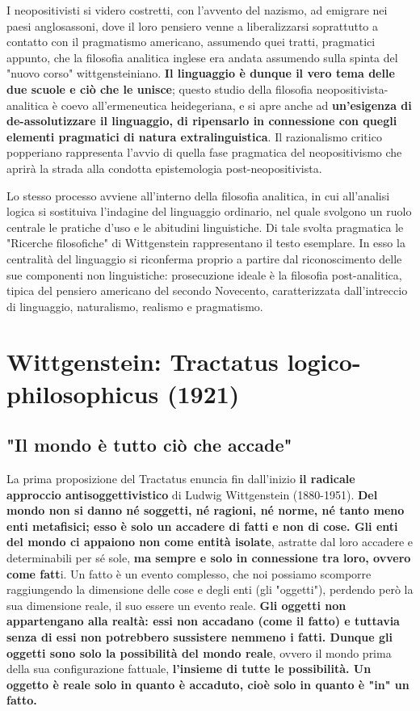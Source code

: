 I neopositivisti
si videro costretti, con l'avvento del nazismo,
ad emigrare nei paesi anglosassoni, dove il loro
pensiero venne a liberalizzarsi soprattutto
a contatto con il pragmatismo americano,
assumendo quei tratti, pragmatici appunto, che
la filosofia analitica inglese era andata
assumendo sulla spinta del "nuovo corso"
wittgensteiniano.
\textbf{Il linguaggio è dunque il vero tema delle due scuole e ciò
che le unisce}; questo studio della filosofia
neopositivista-analitica è coevo all'ermeneutica
heidegeriana, e si apre anche ad \textbf{un'esigenza
di de-assolutizzare il linguaggio, di ripensarlo
in connessione con quegli elementi pragmatici di
natura extralinguistica}. Il razionalismo critico
popperiano rappresenta l'avvio di quella fase
pragmatica del neopositivismo che aprirà la
strada alla condotta epistemologia post-neopositivista.


Lo stesso processo avviene all'interno della filosofia
analitica, in cui all'analisi logica si sostituiva
l'indagine del linguaggio ordinario, nel quale
svolgono un ruolo centrale le pratiche d'uso e le
abitudini linguistiche. Di tale svolta pragmatica
le "Ricerche filosofiche" di Wittgenstein
rappresentano il testo esemplare. In esso la
centralità del linguaggio si riconferma proprio
a partire dal riconoscimento delle sue
componenti non linguistiche: prosecuzione
ideale è la filosofia post-analitica, tipica del
pensiero americano del secondo Novecento,
caratterizzata dall'intreccio di linguaggio,
naturalismo, realismo e pragmatismo.

\section{Wittgenstein: Tractatus logico-philosophicus (1921)}

\subsection{"Il mondo è tutto ciò che accade"}

La prima proposizione del Tractatus enuncia
fin dall'inizio \textbf{il radicale approccio antisoggettivistico}
di Ludwig Wittgenstein (1880-1951). \textbf{Del
mondo non si danno né soggetti, né ragioni, né norme,
né tanto meno enti metafisici; esso è solo un accadere
di fatti e non di cose. Gli  enti del mondo ci appaiono
non come entità isolate}, astratte dal loro accadere e
determinabili per sé sole, \textbf{ma sempre e solo in connessione
tra loro, ovvero come fatt}i. Un fatto è un evento
complesso, che noi possiamo scomporre raggiungendo
la dimensione delle cose e degli enti (gli "oggetti"),
perdendo però la sua dimensione reale, il suo essere
un evento reale. \textbf{Gli oggetti non appartengano
alla realtà: essi non accadano (come il fatto) e tuttavia
senza di essi non potrebbero sussistere nemmeno i
fatti. Dunque gli oggetti sono solo la possibilità
del mondo reale}, ovvero il mondo prima della sua
configurazione fattuale,\textbf{ l'insieme di tutte le
possibilità. Un oggetto è reale solo
in quanto è accaduto, cioè solo in quanto è
"in" un fatto.}

